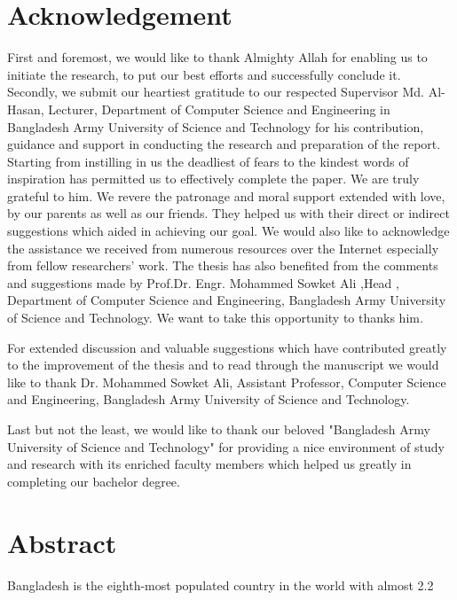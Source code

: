 \documentclass[a4paper,12pt]{article}
\begin{document}
\section{Acknowledgement}
\vspace*{-0.7cm}
\justifying
\large
First and foremost, we would like to thank Almighty Allah for enabling us to initiate the research, to put our best efforts and successfully conclude it. Secondly, we submit our heartiest gratitude to our respected Supervisor Md. Al-Hasan, Lecturer, Department of Computer Science and Engineering in Bangladesh Army University of Science and Technology for his contribution, guidance and support in conducting the research and preparation of the report. Starting from instilling in us the deadliest of fears to the kindest words of inspiration has permitted us to effectively complete the paper. We are truly grateful to him. We revere the patronage and moral support extended with love, by our parents as well as our friends. They helped us with their direct or indirect suggestions which aided in achieving our goal. We would also like to acknowledge the assistance we received from numerous resources over the Internet especially from fellow researchers’ work.
The thesis has also benefited from the comments and suggestions made by Prof.Dr. Engr. Mohammed Sowket Ali ,Head , Department of Computer Science and Engineering, Bangladesh Army University of Science and Technology. We want to take this opportunity to thanks him.

For extended discussion and valuable suggestions which have contributed greatly to the improvement of the thesis and to read through the manuscript we would like to thank 
Dr. Mohammed Sowket Ali, Assistant Professor, Computer Science and Engineering, Bangladesh Army University of Science and Technology.

Last but not the least, we would like to thank our beloved "Bangladesh Army University of Science and Technology" for providing a nice environment of study and research with its enriched faculty members which helped us greatly in completing our bachelor degree. 




\newpage
\vspace*{-1cm}\section*{Abstract}
\justifying
Bangladesh is the eighth-most populated country in the world with almost 2.2%
\end{document}
